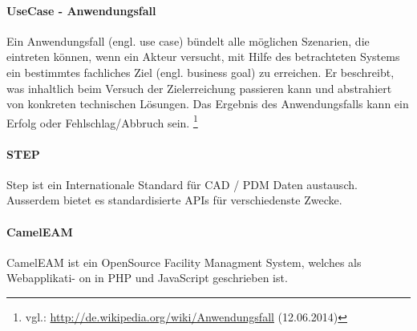 \paragraph{UseCase - Anwendungsfall}
Ein Anwendungsfall (engl. use case) bündelt alle möglichen Szenarien, die eintreten können, wenn ein Akteur versucht, mit Hilfe des betrachteten Systems ein bestimmtes fachliches Ziel (engl. business goal) zu erreichen. Er beschreibt, was inhaltlich beim Versuch der Zielerreichung passieren kann und abstrahiert von konkreten technischen Lösungen. Das Ergebnis des Anwendungsfalls kann ein Erfolg oder Fehlschlag/Abbruch sein. \footnote{vgl.: \url{http://de.wikipedia.org/wiki/Anwendungsfall} (12.06.2014)}

\paragraph{STEP}
Step ist ein Internationale Standard für CAD / PDM Daten austausch. Ausserdem bietet es standardisierte APIs für verschiedenste Zwecke.

\paragraph{CamelEAM}
CamelEAM ist ein OpenSource Facility Managment System, welches als Webapplikati- on in PHP und JavaScript geschrieben ist.


